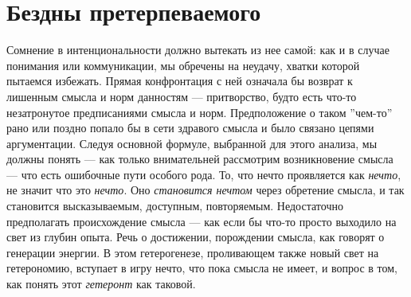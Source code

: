 \documentclass[12pt]{book}
\begin{document}
\section{Бездны претерпеваемого}

Сомнение в интенциональности должно вытекать из нее самой: как и в случае понимания или коммуникации, мы обречены на неудачу, хватки которой пытаемся избежать. Прямая конфронтация с ней означала бы возврат к лишенным смысла и норм данностям --- притворство, будто есть что-то незатронутое предписаниями смысла и норм. Предположение о таком ''чем-то'' рано или поздно попало бы в сети здравого смысла и было связано цепями аргументации. Следуя основной формуле, выбранной для этого анализа, мы должны понять --- как только внимательней рассмотрим возникновение смысла --- что есть ошибочные пути особого рода. То, что нечто проявляется как \textit{нечто}, не значит что это \textit{нечто}. Оно \textit{становится нечтом} через обретение смысла, и так становится высказываемым, доступным, повторяемым. Недостаточно предполагать происхождение смысла --- как если бы что-то просто выходило на свет из глубин опыта. Речь о достижении, порождении смысла, как говорят о генерации энергии. В этом гетерогенезе, проливающем также новый свет на гетерономию, вступает в игру нечто, что пока смысла не имеет, и вопрос в том, как понять этот \textit{гетеронт} как таковой.
\end{document}
